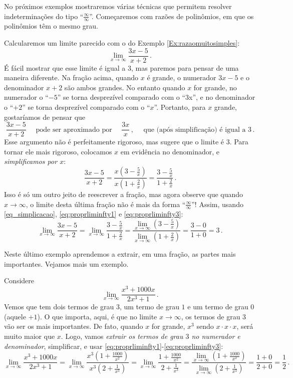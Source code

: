 No próximos exemplos mostraremos várias técnicas que permitem resolver
indeterminações do tipo ``$\frac{\infty}{\infty}$''.
Começaremos com razões de polinômios, em que os polinômios têm o mesmo grau.
\begin{ex} Calcularemos um limite parecido com o 
do Exemplo \ref{Ex:razaomuitosimples}:
\[\lim_{x\to\infty}\frac{3x-5}{x+2}\,.\]
É fácil mostrar que esse limite é igual a $3$, mas paremos para pensar
de uma maneira diferente.  Na fração acima, quando $x$ é grande, 
o numerador $3x-5$ e o denominador $x+2$ são ambos grandes.
No entanto quando $x$ for grande, 
no numerador o ``$-5$'' se torna desprezível comparado com o ``3x'', e 
no denominador o ``$+2$'' 
se torna desprezível comparado com o ``$x$''.
Portanto, para $x$ grande, gostaríamos de pensar que
$$
\frac{3x-5}{x+2}\quad\text{ pode ser aproximado por } 
\quad\frac{3x}{x}\,, \quad \text{ que (após simplificação) é igual a }3\,.
$$
Esse argumento não é perfeitamente rigoroso, mas 
sugere que o limite é $3$. Para tornar ele 
mais rigoroso, colocamos $x$ em evidência no
denominador, e \emph{simplificamos por $x$}:
\begin{equation}\label{eq_simplicacao}
\frac{3x-5}{x+2}=\frac{x(3-\frac5x)}{x(1+\frac{2}{x})}
=\frac{3-\frac5x}{1+\frac{2}{x}}\,.
\end{equation}
Isso é só um outro jeito de reescrever a fração, mas agora observe que
quando $x\to \infty$, o limite desta última fração
não é mais da forma ``$\frac{\infty}{\infty}$''! 
Assim, usando \eqref{eq_simplicacao}, 
\eqref{eq:proprliminfty1} e \eqref{eq:proprliminfty3}:
$$
\lim_{x\to\infty}\frac{3x-5}{x+2}=
\lim_{x\to\infty}\frac{3-\frac5x}{1+\frac{2}{x}}=
\frac{\lim_{x\to\infty}(3-\frac5x)}{\lim_{x\to\infty}(1+\frac{2}{
x})}
=\frac{3-0}{1+ 0}=3\,.
$$
\end{ex}
Neste último exemplo aprendemos a extrair, em uma fração, as partes
mais importantes. Vejamos mais um exemplo.

\begin{ex}
Considere 
\[ 
\lim_{x\to\infty}\frac{x^3+1000x}{2x^3+1}\,.
\]
Vemos que tem dois termos de grau $3$, um termo de grau $1$ e um termo de
grau $0$ (aquele $+1$). O que importa, aqui, é que no limite
$x\to\infty$, os termos de grau $3$ vão ser os mais importantes.
De fato, quando $x$ for grande, $x^3$ sendo $x\cdot x\cdot x$, será muito maior
que $x$. Logo, vamos
\emph{extrair os termos de grau $3$ no numerador e
denominador}, simplificar, e 
usar \eqref{eq:proprliminfty1}-\eqref{eq:proprliminfty3}:
\[ 
\lim_{x\to\infty}\frac{x^3+1000x}{2x^3+1}=
\lim_{x\to\infty}\frac{x^3(1+\frac{1000}{x^2})}{x^3(2+\frac{1}{x^3})}=
\lim_{x\to\infty}\frac{1+\frac{1000}{x^2}}{2+\frac{1}{x^3}}=
\frac{\lim_{x\to\infty}(1+\frac{1000}{x^2})}{\lim_{x\to\infty}(2+\frac{1}{x^3})}=
\frac{1+0}{2+0}=\frac{1}{2}\,.
\]
\end{ex}

